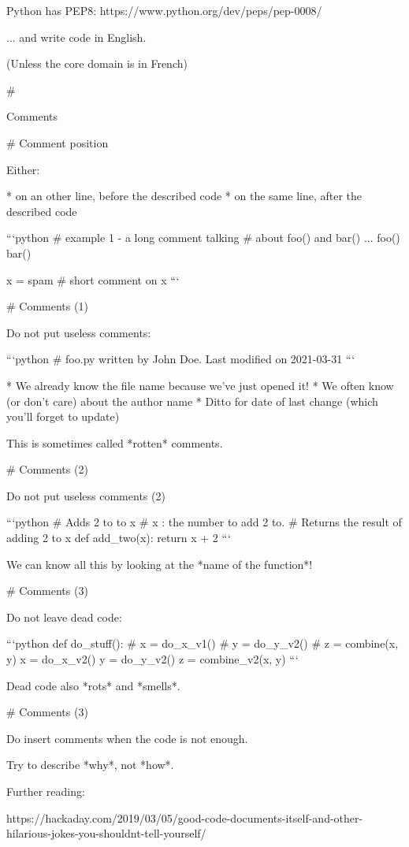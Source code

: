 Python has PEP8:  https://www.python.org/dev/peps/pep-0008/

... and write code in English.

(Unless the core domain is in French)

#

\huge \center Comments

# Comment position

Either:

* on an other line, before the described code
* on the same line, after the described code

\vfill

```python
# example 1 - a long comment talking
# about foo() and bar() ...
foo()
bar()

x = spam  # short comment on x
```


# Comments (1)

Do not put useless comments:

```python
# foo.py written by John Doe. Last modified on 2021-03-31
```

* We already know the file name because  we've just opened it!
* We often know (or don't care) about the author name
* Ditto for date of last change (which you'll forget to update)

\vfill

This is sometimes called *rotten* comments.

# Comments (2)

Do not put useless comments (2)

```python
# Adds 2 to to x
# x : the number to add 2 to.
# Returns the result of adding 2 to x
def add_two(x):
    return x + 2
```

\vfill

We can know all this by looking at the *name of the function*!

# Comments (3)

Do not leave dead code:

```python
def do_stuff():
    # x = do_x_v1()
    # y = do_y_v2()
    # z = combine(x, y)
    x = do_x_v2()
    y = do_y_v2()
    z = combine_v2(x, y)
```

Dead code also *rots* and *smells*.


# Comments (3)

Do insert comments when the code is not enough.

Try to describe *why*, not *how*.

Further reading:

https://hackaday.com/2019/03/05/good-code-documents-itself-and-other-hilarious-jokes-you-shouldnt-tell-yourself/

